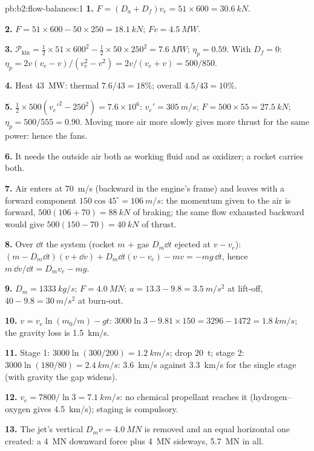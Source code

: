 \begin{solution}{pb:b2:flow-balances:1}
\textbf{1.} $F = (D_a + D_f)v_e = 51 \times 600 = \qty{30.6}{kN}$.

\textbf{2.} $F = 51 \times 600 - 50 \times 250 = \qty{18.1}{kN}$; $Fv = \qty{4.5}{MW}$.

\textbf{3.} $\mathcal P_{\text{kin}} = \tfrac12 \times 51 \times 600^2 - \tfrac12 \times 50 \times 250^2 =
\qty{7.6}{MW}$; $\eta_p = 0.59$. With $D_f = 0$: $\eta_p = 2v(v_e - v)/(v_e^2 - v^2)
= 2v/(v_e + v) = 500/850$.

\textbf{4.} Heat \qty{43}{MW}: thermal $7.6/43 = 18\%$; overall $4.5/43 = 10\%$.

\textbf{5.} $\tfrac12 \times 500(v_e'^2 - 250^2) = 7.6 \times 10^6$: $v_e' = \qty{305}{m/s}$;
$F = 500 \times 55 = \qty{27.5}{kN}$; $\eta_p = 500/555 = 0.90$. Moving more air more
slowly gives more thrust for the same power: hence the fans.

\textbf{6.} It needs the outside air both as working fluid and as
oxidizer; a rocket carries both.

\textbf{7.} Air enters at \qty{70}{m/s} (backward in the engine's frame)
and leaves with a forward component $150\cos45^\circ = \qty{106}{m/s}$: the
momentum given to the air is forward, $500(106 + 70) = \qty{88}{kN}$ of
braking; the same flow exhausted backward would give $500(150 - 70) =
\qty{40}{kN}$ of thrust.

\textbf{8.} Over $\dd t$ the system (rocket $m$ + gas $D_m\dd t$ ejected at
$v - v_e$): $(m - D_m\dd t)(v + \dd v) + D_m\dd t(v - v_e) - mv = -mg\,\dd t$,
hence $m\,\dd v/\dd t = D_mv_e - mg$.

\textbf{9.} $D_m = \qty{1333}{kg/s}$; $F = \qty{4.0}{MN}$; $a = 13.3 - 9.8 =
\qty{3.5}{m/s^2}$ at lift-off, $40 - 9.8 = \qty{30}{m/s^2}$ at burn-out.

\textbf{10.} $v = v_e\ln(m_0/m) - gt$: $3000\ln3 - 9.81 \times 150 = 3296 - 1472 =
\qty{1.8}{km/s}$; the gravity loss is \qty{1.5}{km/s}.

\textbf{11.} Stage 1: $3000\ln(300/200) = \qty{1.2}{km/s}$; drop \qty{20}{t}; stage
2: $3000\ln(180/80) = \qty{2.4}{km/s}$: \qty{3.6}{km/s} against \qty{3.3}{km/s}
for the single stage (with gravity the gap widens).

\textbf{12.} $v_e = 7800/\ln3 = \qty{7.1}{km/s}$: no chemical propellant
reaches it (hydrogen--oxygen gives \qty{4.5}{km/s}); staging is compulsory.

\textbf{13.} The jet's vertical  $D_mv = \qty{4.0}{MN}$ is
removed and an equal horizontal one created: a \qty{4}{MN} downward force
plus \qty{4}{MN} sideways, \qty{5.7}{MN} in all.


\end{solution}
